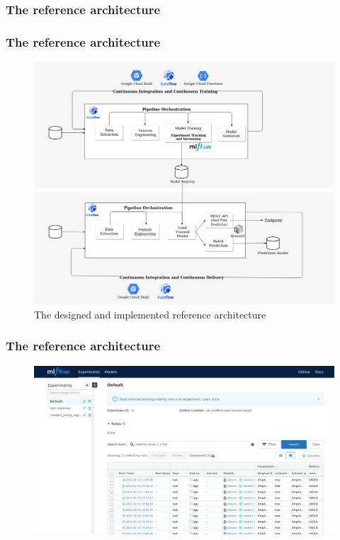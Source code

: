 \documentclass{beamer}
\begin{document}
\begin{frame}
\frametitle{The reference architecture}

\frametitle{The reference architecture}
\begin{figure}
\includegraphics[scale=0.2]{figure/MLOps_Architecture_example.png}
\caption{The designed and implemented reference architecture}
\end{figure}

\end{frame}


\begin{frame}
\frametitle{The reference architecture}
\begin{figure}
\includegraphics[scale=0.35]{figure/mlflow_filter_metrics.png}
\end{figure}

\end{frame}
\end{document}
